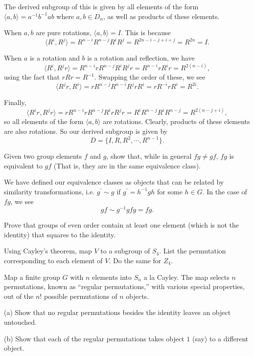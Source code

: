 \documentclass[../group-theory-in-a-nutshell-for-physicists.tex]{subfiles}
\begin{document}
\begin{questions}
\begin{solution}
The derived subgroup of this is given by all elements of the form
$\langle a,b\rangle = a^{- 1}b^{- 1}ab$ where $a,b \in D_{n}$, as
well as products of these elements.

When $a,b$ are pure rotations, $\langle a,b\rangle = I$. This is
because
\[
\langle R^{i},R^{j}\rangle = R^{n - i}R^{n - j}R^{i}R^{j} = R^{2n - i - j + i + j} = R^{2n} = I.
\]

When $a$ is a rotation and $b$ is a rotation and reflection, we have
\[
\langle R^{i},R^{j}r\rangle = R^{n - i}rR^{n - j}R^{i}R^{j}r = R^{n - i}rR^{i}r = R^{2(n - i)},
\]
using the fact that $rRr = R^{- 1}$. Swapping the order of these, we
see
\[
\langle R^{j}r,R^{i}\rangle = rR^{n - j}R^{n - i}R^{j}rR^{i} = rR^{- i}rR^{i} = R^{2i}.
\]

Finally,
\[
\langle R^{i}r,R^{j}r\rangle = rR^{n - i}rR^{n - j}R^{i}rR^{j}r = R^{i}R^{n - j}R^{i}R^{n - j} = R^{2(n - j + i)},
\]
so all elements of the form $\langle a,b\rangle$ are rotations.
Clearly, products of these elements are also rotations. So our derived
subgroup is given by
\[
D = \{ I,R,R^{2},\cdots,R^{n - 1}\}.
\]
\end{solution}

\question Given two group elements $f$ and $g$, show that, while in general
$fg \neq gf$, $fg$ is equivalent to $gf$ (That is, they are in the
same equivalence class).

\begin{solution}
We have defined our equivalence classes as objects that can be related
by similarity transformations, i.e. $g^{\prime} \sim g$ if
$g^{\prime} = h^{- 1}gh$ for some $h \in G$. In the case of $fg$,
we see
\[
gf \sim g^{- 1}gfg = fg.
\]
\end{solution}

\question Prove that groups of even order contain at least one element (which is
not the identity) that squares to the identity.

\question Using Cayley's theorem, map $V$ to a subgroup of $S_{4}$. List the
permutation corresponding to each element of $V$. Do the same for
$Z_{4}$.

\question Map a finite group $G$ with $n$ elements into $S_{n}$ a la Cayley.
The map selects $n$ permutations, known as ``regular permutations,''
with various special properties, out of the $n!$ possible permutations
of $n$ objects.

(a) Show that no regular permutations besides the identity leaves an object
untouched.

(b) Show that each of the regular permutations takes object $1$ (say) to a
different object.


\end{questions}
\end{document}
